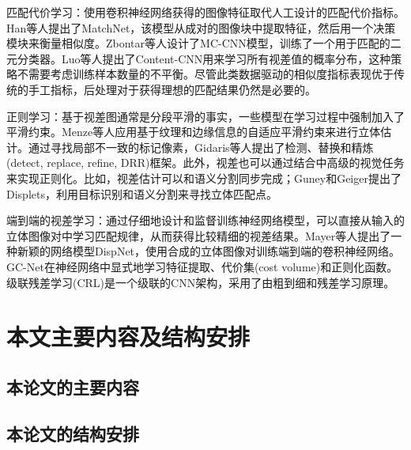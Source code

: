 匹配代价学习：使用卷积神经网络获得的图像特征取代人工设计的匹配代价指标。Han等人\cite{Han_2015_CVPR}提出了MatchNet，该模型从成对的图像块中提取特征，然后用一个决策模块来衡量相似度。Zbontar等人\cite{zbontar2016stereo}设计了MC-CNN模型，训练了一个用于匹配的二元分类器。Luo等人\cite{luo2016efficient}提出了Content-CNN用来学习所有视差值的概率分布，这种策略不需要考虑训练样本数量的不平衡。尽管此类数据驱动的相似度指标表现优于传统的手工指标，后处理对于获得理想的匹配结果仍然是必要的。

正则学习：基于视差图通常是分段平滑的事实，一些模型在学习过程中强制加入了平滑约束。Menze等人\cite{Menze_2015_CVPR}应用基于纹理和边缘信息的自适应平滑约束来进行立体估计。通过寻找局部不一致的标记像素，Gidaris等人\cite{gidaris2016detect}提出了检测、替换和精炼(detect, replace, refine, DRR)框架。此外，视差也可以通过结合中高级的视觉任务来实现正则化。比如，视差估计可以和语义分割同步完成\cite{Yamaguchi2014}；Guney和Geiger提出了Displets\cite{guney2015displets}，利用目标识别和语义分割来寻找立体匹配点。

端到端的视差学习：通过仔细地设计和监督训练神经网络模型，可以直接从输入的立体图像对中学习匹配规律，从而获得比较精细的视差结果。Mayer\cite{mayer2016large}等人提出了一种新颖的网络模型DispNet，使用合成的立体图像对训练端到端的卷积神经网络。GC-Net\cite{kendall2017end}在神经网络中显式地学习特征提取、代价集(cost volume)和正则化函数。级联残差学习(CRL)\cite{pang2017cascade}是一个级联的CNN架构，采用了由粗到细和残差学习原理。

\section{本文主要内容及结构安排}
\subsection{本论文的主要内容}

\subsection{本论文的结构安排}












